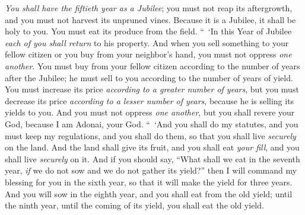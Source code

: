 \begin{biblechapter}
\verse \textit{You shall have the fiftieth year as a Jubilee}; you must not reap its aftergrowth, and you must not harvest its unpruned vines.
\verse Because it is a Jubilee, it shall be holy to you. You must eat its produce from the field.
\verse “ ‘In this Year of Jubilee \textit{each of you shall return} to his property.
\verse And when you sell something to your fellow citizen or you buy from your neighbor’s hand, you must not oppress \textit{one another}.
\verse You must buy from your fellow citizen according to the number of years after the Jubilee; he must sell to you according to the number of years of yield.
\verse You must increase its price \textit{according to a greater number of years}, but you must decrease its price \textit{according to a lesser number of years}, because he is selling its yields to you.
\verse And you must not oppress \textit{one another}, but you shall revere your God, because I am Adonai, your God.
\verse “ ‘And you shall do my statutes, and you must keep my regulations, and you shall do them, so that you shall live \textit{securely} on the land.
\verse And the land shall give its fruit, and you shall eat \textit{your fill}, and you shall live \textit{securely} on it.
\verse And if you should say, “What shall we eat in the seventh year, \textit{if} we do not sow and we do not gather its yield?”
\verse then I will command my blessing for you in the sixth year, so that it will make the yield for three years.
\verse And you will sow in the eighth year, and you shall eat from the old yield; until the ninth year, until the coming of its yield, you shall eat the old yield.

\end{biblechapter}
